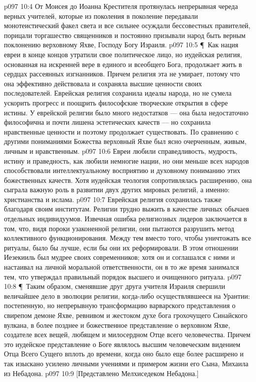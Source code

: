 \vs p097 10:4 От Моисея до Иоанна Крестителя протянулась непрерывная череда верных учителей, которые из поколения в поколение передавали монотеистический факел света и все сильнее осуждали бессовестных правителей, порицали торгашество священников и постоянно призывали народ быть верным поклонению верховному Яхве, Господу Богу Израиля.
\vs p097 10:5 \P\ Как нация евреи в конце концов утратили свое политическое лицо, но иудейская религия, основанная на искренней вере в единого и всеобщего Бога, продолжает жить в сердцах рассеянных изгнанников. Причем религия эта не умирает, потому что она эффективно действовала и сохраняла высшие ценности своих последователей. Еврейская религия сохранила идеалы народа, но не сумела ускорить прогресс и поощрить философские творческие открытия в сфере истины. У еврейской религии было много недостатков --- она была недостаточно философична и почти лишена эстетических качеств --- но сохранила нравственные ценности и поэтому продолжает существовать. По сравнению с другими пониманиями Божества верховный Яхве был ясно очерченным, живым, личным и нравственным.
\vs p097 10:6 Евреи любили справедливость, мудрость, истину и праведность, как любили немногие нации, но они меньше всех народов способствовали интеллектуальному восприятию и духовному пониманию этих божественных качеств. Хотя иудейская теология сопротивлялась расширению, она сыграла важную роль в развитии двух других мировых религий, а именно: христианства и ислама.
\vs p097 10:7 Еврейская религия сохранилась также благодаря своим институтам. Религии трудно выжить в качестве личных обычаев отдельных индивидуумов. Извечная ошибка религиозных лидеров заключается в том, что, видя пороки узаконенной религии, они пытаются разрушить метод коллективного функционирования. Между тем вместо того, чтобы уничтожать все ритуалы, было бы лучше, если бы они их реформировали. В этом отношении Иезекииль был мудрее своих современников; хотя он и соглашался с ними и настаивал на личной моральной ответственности, он в то же время занимался тем, что утверждал правильный порядок высшего и очищенного ритуала.
\vs p097 10:8 \P\ Таким образом, сменявшие друг друга учителя Израиля свершили величайшее дело в эволюции религии, когда\hyp{}либо осуществлявшееся на Урантии: постепенную, но непрерывную трансформацию варварского представления о свирепом демоне Яхве, ревнивом и жестоком духе бога грохочущего Синайского вулкана, в более позднее и божественное представление о верховном Яхве, создателе всех вещей, любящем и милосердном Отце всего человечества. Причем это иудейское представление о Боге являлось высшим человеческим видением Отца Всего Сущего вплоть до времени, когда оно было еще более расширено и так изыскано усилено личными учениями и примером жизни его Сына, Михаила из Небадона.
\vs p097 10:9 [Представлено Мелхиседеком Небадона.]
